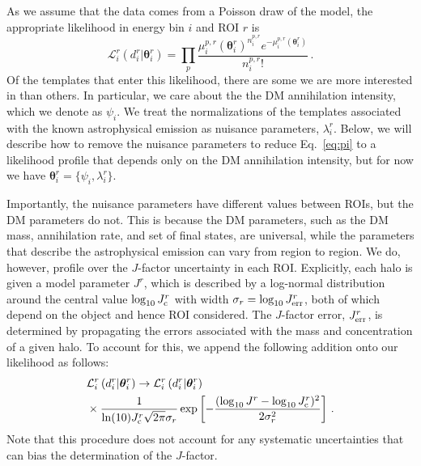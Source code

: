 As we assume that the data comes from a Poisson draw of the model, the appropriate likelihood in energy bin $i$ and ROI $r$ is
\begin{equation}
\mathcal{L}_i^r(d_i^r | {\boldsymbol \theta}_i^r) = \prod_p \frac{\mu_i^{p,r}({\boldsymbol \theta}_i^r)^{n_i^{p,r}} e^{-\mu_i^{p,r}({\boldsymbol \theta}_i^r)}}{n_i^{p,r}!}\,.
\label{eq:pi}
\end{equation}
Of the templates that enter this likelihood, there are some we are more interested in than others. In particular, we care about the the DM annihilation intensity, which we denote as $\psi_i$.  We treat the normalizations of the templates associated with the known astrophysical emission as nuisance parameters, $\lambda_i^r$. Below, we will describe how to remove the nuisance parameters to reduce Eq.~\ref{eq:pi} to a likelihood profile that depends only on the DM annihilation intensity, but for now we have ${\boldsymbol \theta}_i^r = \{ \psi_i, \lambda_i^r \}$.

Importantly, the nuisance parameters have different values between ROIs, but the DM parameters do not.  This is because the DM parameters, such as the DM mass, annihilation rate, and set of final states, are universal, while the parameters that describe the astrophysical emission can vary from region to region.
We do, however, profile over the $J$-factor uncertainty in each ROI.
Explicitly, each halo is given a model parameter $J^r$, which is described by a
log-normal distribution around the central value $\log_{10} J_{\rm c}^r$ with width $\sigma_r = \log_{10} J_{\rm err}^r$, both of which depend on the object and hence ROI considered.  The $J$-factor error, $J_{\rm err}^r$, is determined by propagating the errors associated with the mass and concentration of a given halo. To account for this, we append the following addition onto our likelihood as follows:
\begin{equation}\begin{aligned}
&\mathcal{L}_i^r \left( d_i^r | \boldsymbol{\theta}_i^r \right) \to \mathcal{L}_i^r \left( d_i^r | \boldsymbol{\theta}_i^r \right) \\
&\times \frac{1}{\ln(10) J_{\rm c}^r\sqrt{2\pi} \sigma_r} \exp \left[ - \frac{(\log_{10} J^r - \log_{10} J_{\rm c}^r)^2}{2\sigma_r^2} \right]\,.
\label{eq:Jlognormal}
\end{aligned}\end{equation}
Note that this procedure does not account for any systematic uncertainties that can bias the determination of the $J$-factor.

